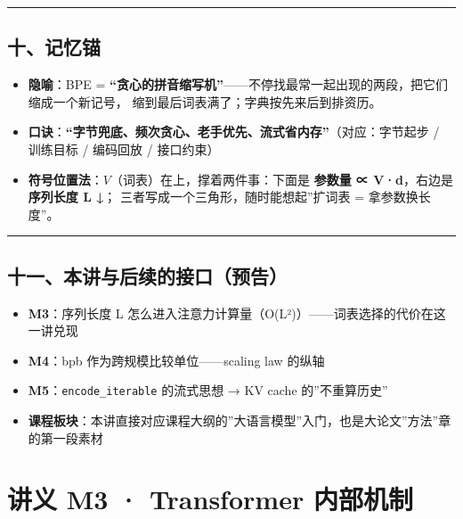 \documentclass[
  chinese,
  11pt,
]{ctexart}
\providecommand{\tightlist}{%
  \setlength{\itemsep}{0pt}\setlength{\parskip}{0pt}}
\begin{document}
\begin{center}\rule{0.5\linewidth}{0.5pt}\end{center}

\subsection{十、记忆锚}\label{ux5341ux8bb0ux5fc6ux951a}

\begin{itemize}
\tightlist
\item
  \textbf{隐喻}：BPE = \textbf{``贪心的拼音缩写机''}------不停找最常一起出现的两段，把它们缩成一个新记号， 缩到最后词表满了；字典按先来后到排资历。
\item
  \textbf{口诀}：\textbf{``字节兜底、频次贪心、老手优先、流式省内存''}（对应：字节起步 / 训练目标 / 编码回放 / 接口约束）
\item
  \textbf{符号位置法}：\(V\)（词表）在上，撑着两件事：下面是 \textbf{参数量 ∝ V·d}，右边是 \textbf{序列长度 L ↓}； 三者写成一个三角形，随时能想起''扩词表 = 拿参数换长度''。
\end{itemize}

\begin{center}\rule{0.5\linewidth}{0.5pt}\end{center}

\subsection{十一、本讲与后续的接口（预告）}\label{ux5341ux4e00ux672cux8bb2ux4e0eux540eux7eedux7684ux63a5ux53e3ux9884ux544a}

\begin{itemize}
\tightlist
\item
  \textbf{M3}：序列长度 L 怎么进入注意力计算量（O(L²)）------词表选择的代价在这一讲兑现
\item
  \textbf{M4}：bpb 作为跨规模比较单位------scaling law 的纵轴
\item
  \textbf{M5}：\texttt{encode\_iterable} 的流式思想 → KV cache 的''不重算历史''
\item
  \textbf{课程板块}：本讲直接对应课程大纲的''大语言模型''入门，也是大论文''方法''章的第一段素材
\end{itemize}

\newpage

\section{讲义 M3 · Transformer 内部机制}\label{ux8bb2ux4e49-m3-transformer-ux5185ux90e8ux673aux5236}
\end{document}
